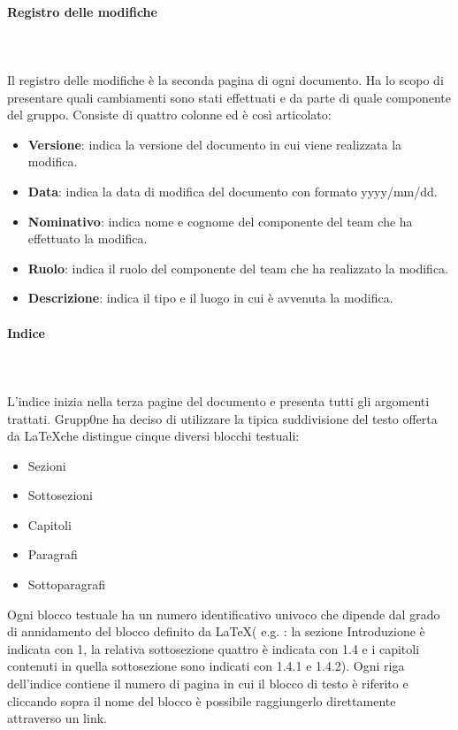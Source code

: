 \documentclass[../norme-di-progetto.tex]{subfiles}
\begin{document}
\paragraph{Registro delle modifiche}\mbox{}\\
\label{par:registro delle modifiche}
\\Il registro delle modifiche è la seconda pagina di ogni documento. Ha lo scopo di presentare quali cambiamenti sono stati effettuati e da parte di quale componente del gruppo. Consiste di quattro colonne ed è così articolato:
\begin{itemize}
	\item \textbf{Versione}: indica la versione del documento in cui viene realizzata la modifica.
	\item \textbf{Data}: indica la data di modifica del documento con formato yyyy/mm/dd.
	\item \textbf{Nominativo}: indica nome e cognome del componente del team che ha effettuato la modifica.
	\item \textbf{Ruolo}: indica il ruolo del componente del team che ha realizzato la modifica.
	\item \textbf{Descrizione}: indica il tipo e il luogo in cui è avvenuta la modifica.
\end{itemize}
\paragraph{Indice}\mbox{}\\
\label{par:indice}
\\L'indice inizia nella terza pagine del documento e presenta tutti gli argomenti trattati. Grupp0ne ha deciso di utilizzare la tipica suddivisione del testo offerta da \LaTeX che distingue cinque diversi blocchi testuali:
\begin{itemize}
	\item Sezioni
	\item Sottosezioni
	\item Capitoli
	\item Paragrafi
	\item Sottoparagrafi 
\end{itemize}
Ogni blocco testuale ha un numero identificativo univoco che dipende dal grado di annidamento del blocco definito da \LaTeX ( e.g. : la sezione Introduzione è indicata con 1, la relativa sottosezione quattro è indicata con 1.4 e i capitoli contenuti in quella sottosezione sono indicati con 1.4.1 e 1.4.2).
\newline Ogni riga dell'indice contiene il numero di pagina in cui il blocco di testo è riferito e cliccando sopra il nome del blocco è possibile raggiungerlo direttamente attraverso un link.
\end{document}
